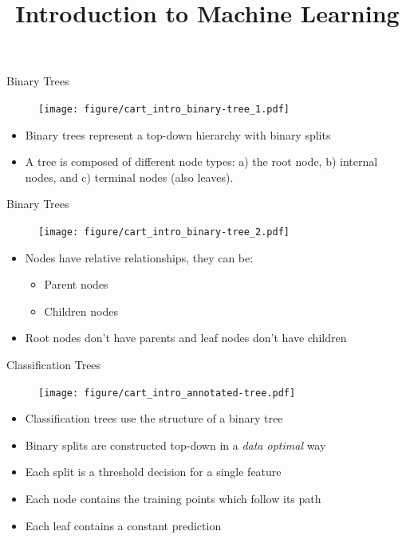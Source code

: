\documentclass[11pt,compress,t,notes=noshow, xcolor=table]{beamer}
\title{Introduction to Machine Learning}
\institute{\href{https://compstat-lmu.github.io/lecture_i2ml/}{compstat-lmu.github.io/lecture\_i2ml}}
\date{}
\begin{document}
\sloppy

\begin{vbframe}{Binary Trees}
    \begin{figure}
    \centering
      \texttt{[image: figure/cart\_intro\_binary-tree\_1.pdf]}
    \end{figure}
  \begin{itemize}
    \item Binary trees represent a top-down hierarchy with binary splits
    \item A tree is composed of different node types: a) the root node, b) internal nodes, and c) terminal nodes (also leaves).
  \end{itemize}
\end{vbframe}

\begin{vbframe}{Binary Trees}
    \begin{figure}
    \centering
      \texttt{[image: figure/cart\_intro\_binary-tree\_2.pdf]}
    \end{figure}
  \begin{itemize}
    \item Nodes have relative relationships, they can be:
    \begin{itemize}
    \item Parent nodes
    \item Children nodes
    \end{itemize}
    \item Root nodes don't have parents and leaf nodes don't have children
    
  \end{itemize}
\end{vbframe}

\begin{vbframe}{Classification Trees}
    \begin{figure}
    \centering
      \texttt{[image: figure/cart\_intro\_annotated-tree.pdf]}
    \end{figure}
  \begin{itemize}
    \item Classification trees use the structure of a binary tree
    \item Binary splits are constructed top-down in a \emph{data optimal} way
    \item Each split is a threshold decision for a single feature
    \item Each node contains the training points which follow its path
    \item Each leaf contains a constant prediction
  \end{itemize}
\end{vbframe}
\end{document}
